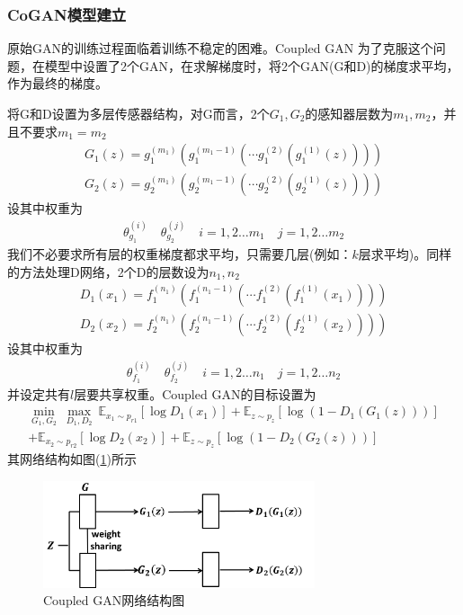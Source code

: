         \subsubsection{CoGAN模型建立}
            \par
            原始GAN的训练过程面临着训练不稳定的困难。Coupled GAN 为了克服这个问题，在模型中设置了2个GAN，在求解梯度时，将2个GAN(G和D)的梯度求平均，作为最终的梯度。
            \par
            将G和D设置为多层传感器结构，对G而言，2个$G_1,G_2$的感知器层数为$m_1,m_2$，并且不要求$m_1 = m_2$
            \begin{align*}
            G_1(z) = g_1^{(m_1)}(g_1^{(m_1-1)}(\cdots g_1^{(2)}(g_1^{(1)}(z))))\\
            G_2(z) = g_2^{(m_1)}(g_2^{(m_1-1)}(\cdots g_2^{(2)}(g_2^{(1)}(z))))
            \end{align*}
            设其中权重为
            \begin{align*}
            \theta_{g_1}^{(i)}\quad \theta_{g_2}^{(j)} \quad i=1,2\dots m_1\quad j=1,2\dots m_2
            \end{align*}
            我们不必要求所有层的权重梯度都求平均，只需要几层(例如：$k$层求平均)。同样的方法处理D网络，2个D的层数设为$n_1,n_2$
            \begin{align*}
            D_1(x_1) = f_1^{(n_1)}(f_1^{(n_1-1)}(\cdots f_1^{(2)}(f_1^{(1)}(x_1))))\\
            D_2(x_2) = f_2^{(n_1)}(f_2^{(n_1-1)}(\cdots f_2^{(2)}(f_2^{(1)}(x_2))))
            \end{align*}
            设其中权重为
            \begin{align*}
            \theta_{f_1}^{(i)}\quad \theta_{f_2}^{(j)} \quad i=1,2\dots n_1\quad j=1,2\dots n_2
            \end{align*}
            并设定共有$l$层要共享权重。Coupled GAN的目标设置为
            \begin{align*}
            \min_{G_1,G_2}\ \max_{D_1,D_2} \ \mathbb{E}_{x_1\sim p_{r1}} [\log D_1(x_1)] + \mathbb{E}_{z\sim p_z}[\log (1-D_1(G_1(z)))] \\
            +\mathbb{E}_{x_2\sim p_{r2}} [\log D_2(x_2)] + \mathbb{E}_{z\sim p_z}[\log (1-D_2(G_2(z)))]
            \end{align*}
            其网络结构如图(\ref{fig:Coupled GAN网络结构图})所示
                \begin{figure}[H]
                \centering
                \includegraphics[width=8cm]{images/Coupled_GAN_network.jpg}
                \caption{Coupled GAN网络结构图}
                \label{fig:Coupled GAN网络结构图}
                \end{figure}
